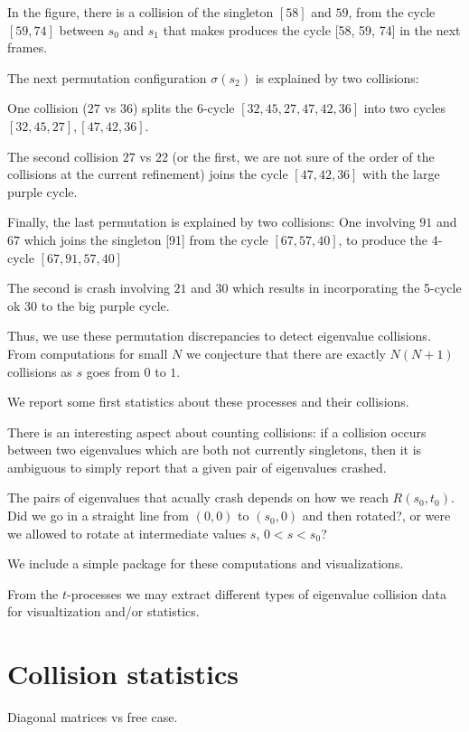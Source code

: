 \documentclass{article}
\begin{document}
	In the figure, there is a collision of the singleton $[58]$ and $59$, from the cycle $[59, 74]$ 
	between $s_0$ and $s_1$ 
	that makes produces the cycle [58, 59, 74] in the next frames.

	The next permutation configuration $\sigma(s_2)$ is explained by two collisions: 

	One collision ($27$ vs $36$) splits the 6-cycle $[32, 45, 27, 47, 42, 36]$ into two cycles 
	$[32, 45, 27], [47, 42, 36]$.

	The second collision $27$ vs $22$ (or the first, we are not sure of the order of the collisions 
	at the current refinement) joins the cycle $[47, 42, 36]$ with the large purple cycle.

	Finally, the last permutation is explained by two collisions: 
	One involving $91$ and $67$
	which joins the singleton [91] 
	from the cycle $[67, 57, 40]$, 
	to produce the 4-cycle $[67, 91, 57, 40]$

	The second is crash involving $21$ and $30$ which results in incorporating the 5-cycle ok $30$ 
	to the big purple cycle.

	Thus, we use these permutation discrepancies to detect eigenvalue collisions. 
	From computations for small $N$ we conjecture that there are exactly $N(N+1)$ 
	collisions as $s$ goes from $0$ to $1$. 

	We report some first statistics about these processes and their collisions.

	There is an interesting aspect about counting collisions: if a collision occurs 
	between two eigenvalues which are both not currently singletons, 
	then it is ambiguous to simply report that a given pair of eigenvalues crashed.
	
	The pairs of eigenvalues that acually crash depends on how we reach $R(s_0,t_0)$.
	Did we go in a straight line from $(0,0)$ to $(s_0,0)$ and then rotated?, or were we allowed
	to rotate at intermediate values $s$, $0 < s < s_0$?

	We include a simple package for these computations and visualizations. 
	
	From the $t$-processes we may extract different types of eigenvalue collision data
	for visualtization and/or statistics.

	\section{Collision statistics}

	Diagonal matrices vs free case.
\end{document}
